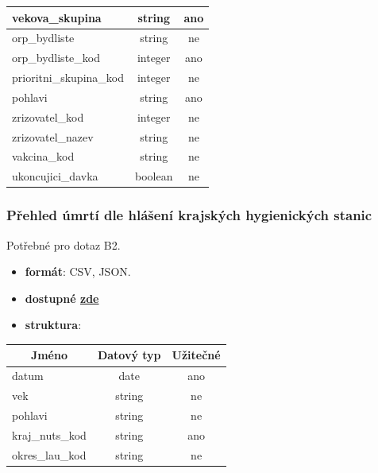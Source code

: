 \documentclass[12pt]{article}
\begin{document}
\begin{center}
\begin{tabular}{ |l|c|c| }
                \hline
                vekova\_skupina & string & ano \\ 
                \hline
                orp\_bydliste & string & ne \\ 
                \hline
                orp\_bydliste\_kod & integer & ano \\ 
                \hline
                prioritni\_skupina\_kod & integer & ne \\ 
                \hline
                pohlavi & string & ano \\ 
                \hline
                zrizovatel\_kod & integer & ne \\ 
                \hline
                zrizovatel\_nazev & string & ne \\ 
                \hline
                vakcina\_kod & string & ne \\ 
                \hline
                ukoncujici\_davka & boolean & ne \\ 
                \hline
            \end{tabular}
        \end{center}
   
\subsubsection*{Přehled úmrtí dle hlášení krajských hygienických stanic}
Potřebné pro dotaz B2.
\begin{itemize}
    \item \textbf{formát}: CSV, JSON.
    \item \textbf{dostupné \href{https://onemocneni-aktualne.mzcr.cz/api/v2/covid-19/umrti.csv}{zde}}
    \item \textbf{struktura}:
\end{itemize}
        \begin{center}
            \begin{tabular}{ |l|c|c| } 
                \hline
                \multicolumn{1}{|c|}{Jméno} & Datový typ & Užitečné \\
                \hline
                \hline
                datum & date & ano \\ 
                \hline
                vek & string & ne \\ 
                \hline
                pohlavi & string & ne \\ 
                \hline
                kraj\_nuts\_kod & string & ano \\ 
                \hline
                okres\_lau\_kod & string & ne \\ 
                \hline
            \end{tabular}
        \end{center} 
\end{document}
